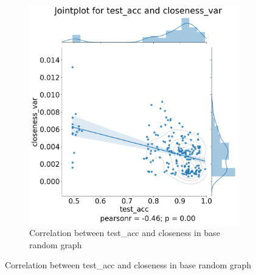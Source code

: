 \begin{figure}[H]
\begin{subfigure}{0.45\textwidth}
        \includegraphics[width=\linewidth]{images/results/random/tanh/jointplot_test_acc_closeness_var.png}
        \caption{Correlation between test\_acc and closeness in base random graph} \label{fig:jp_tanh_close}
    \end{subfigure}%
  

\end{figure}
